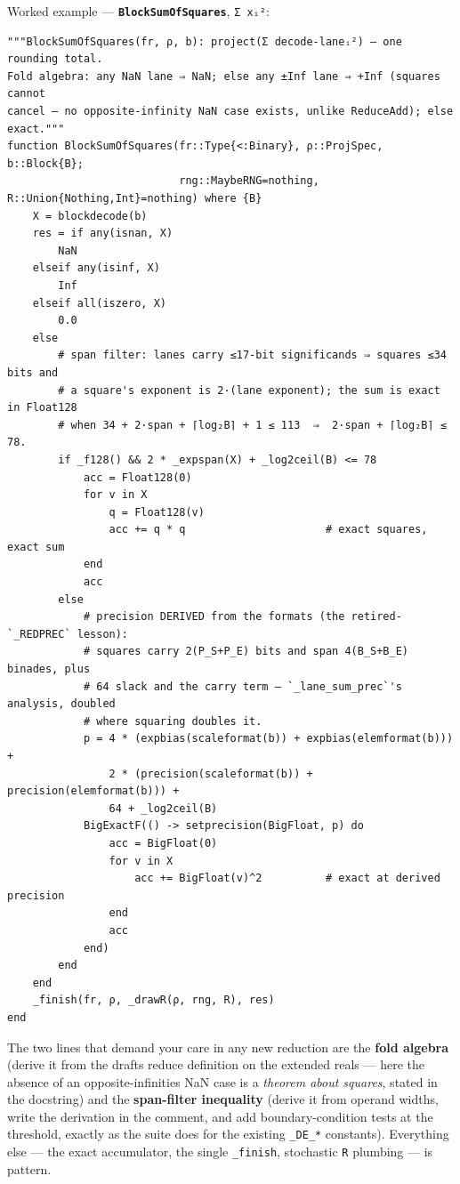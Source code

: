 Worked example — \textbf{\texttt{BlockSumOfSquares}}, \texttt{Σ xᵢ²}:




\nopagebreak[4]
\begin{verbatim}
"""BlockSumOfSquares(fr, ρ, b): project(Σ decode-laneᵢ²) — one rounding total.
Fold algebra: any NaN lane ⇒ NaN; else any ±Inf lane ⇒ +Inf (squares cannot
cancel — no opposite-infinity NaN case exists, unlike ReduceAdd); else exact."""
function BlockSumOfSquares(fr::Type{<:Binary}, ρ::ProjSpec, b::Block{B};
                           rng::MaybeRNG=nothing, R::Union{Nothing,Int}=nothing) where {B}
    X = blockdecode(b)
    res = if any(isnan, X)
        NaN
    elseif any(isinf, X)
        Inf
    elseif all(iszero, X)
        0.0
    else
        # span filter: lanes carry ≤17-bit significands ⇒ squares ≤34 bits and
        # a square's exponent is 2·(lane exponent); the sum is exact in Float128
        # when 34 + 2·span + ⌈log₂B⌉ + 1 ≤ 113  ⇒  2·span + ⌈log₂B⌉ ≤ 78.
        if _f128() && 2 * _expspan(X) + _log2ceil(B) <= 78
            acc = Float128(0)
            for v in X
                q = Float128(v)
                acc += q * q                      # exact squares, exact sum
            end
            acc
        else
            # precision DERIVED from the formats (the retired-`_REDPREC` lesson):
            # squares carry 2(P_S+P_E) bits and span 4(B_S+B_E) binades, plus
            # 64 slack and the carry term — `_lane_sum_prec`'s analysis, doubled
            # where squaring doubles it.
            p = 4 * (expbias(scaleformat(b)) + expbias(elemformat(b))) +
                2 * (precision(scaleformat(b)) + precision(elemformat(b))) +
                64 + _log2ceil(B)
            BigExactF(() -> setprecision(BigFloat, p) do
                acc = BigFloat(0)
                for v in X
                    acc += BigFloat(v)^2          # exact at derived precision
                end
                acc
            end)
        end
    end
    _finish(fr, ρ, _drawR(ρ, rng, R), res)
end
\end{verbatim}



The two lines that demand your care in any new reduction are the \textbf{fold algebra} (derive it from the draft{\textquotesingle}s reduce definition on the extended reals — here the absence of an opposite-infinities NaN case is a \emph{theorem about squares}, stated in the docstring) and the \textbf{span-filter inequality} (derive it from operand widths, write the derivation in the comment, and add boundary-condition tests at the threshold, exactly as the suite does for the existing \texttt{\_\allowbreak{}DE\_\allowbreak{}*} constants). Everything else — the exact accumulator, the single \texttt{\_\allowbreak{}finish}, stochastic \texttt{R} plumbing — is pattern.



